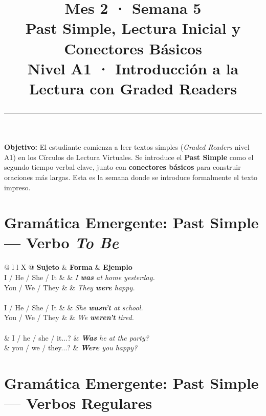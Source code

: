 \documentclass[12pt,a4paper]{article}
\title{%
  \vspace{-1cm}
  {\Huge\bfseries\textcolor{mes2}{Mes 2 · Semana 5}}\\[0.3cm]
  {\Large Past Simple, Lectura Inicial y Conectores Básicos}\\[0.2cm]
  {\large\color{grissuave} Nivel A1 · Introducción a la Lectura con Graded Readers}\\[0.5cm]
  \rule{\textwidth}{1.5pt}
}
\author{}
\date{}
\begin{document}
\maketitle
\thispagestyle{empty}

\begin{cajanivel}
\textbf{Objetivo:} El estudiante comienza a leer textos simples (\textit{Graded Readers} nivel A1) en los Círculos de Lectura Virtuales. Se introduce el \textbf{Past Simple} como el segundo tiempo verbal clave, junto con \textbf{conectores básicos} para construir oraciones más largas. Esta es la semana donde se introduce formalmente el texto impreso.
\end{cajanivel}

\section{Gramática Emergente: Past Simple — Verbo \textit{To Be}}

\begin{cajagrammar}
\begin{tabularx}{\textwidth}{@{} l l X @{}}
\toprule
\textbf{Sujeto} & \textbf{Forma} & \textbf{Ejemplo} \\
\midrule
I / He / She / It &  & \textit{I \textbf{was} at home yesterday.} \\
You / We / They &  & \textit{They \textbf{were} happy.} \\
\midrule
{} \\
I / He / She / It &  & \textit{She \textbf{wasn't} at school.} \\
You / We / They &  & \textit{We \textbf{weren't} tired.} \\
\midrule
{} \\
&  I / he / she / it...? & \textit{\textbf{Was} he at the party?} \\
&  you / we / they...? & \textit{\textbf{Were} you happy?} \\
\bottomrule
\end{tabularx}
\end{cajagrammar}

\section{Gramática Emergente: Past Simple — Verbos Regulares}
\end{document}
